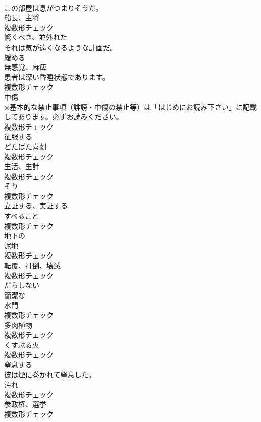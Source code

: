 \documentclass[8pt]{extreport}
\begin{document}
\begin{CJK}{UTF8}{min}
\\	この部屋は息がつまりそうだ。	
\\	[名詞]	船⻑、主将	
\\	複数形チェック
\\	[形容詞]	驚くべき、並外れた	
\\	それは気が遠くなるような計画だ。	
\\	[動詞]	緩める	
\\	[名詞]	無感覚、麻痺	
\\	患者は深い昏睡状態であります。	
\\	複数形チェック
\\	[名詞]	中傷	
\\	※基本的な禁止事項（誹謗・中傷の禁止等）は「はじめにお読み下さい」に記載してあります。必ずお読みください。	
\\	複数形チェック
\\	[動詞]	征服する	
\\	[名詞]	どたばた喜劇	
\\	複数形チェック
\\	[名詞]	生活、生計	
\\	複数形チェック
\\	[名詞]	そり	
\\	複数形チェック
\\	[動詞]	立証する、実証する	
\\	[名詞]	すべること	
\\	複数形チェック
\\	[形容詞]	地下の	
\\	[名詞]	泥地	
\\	複数形チェック
\\	[名詞]	転覆、打倒、壊滅	
\\	複数形チェック
\\	[形容詞]	だらしない	
\\	[形容詞]	簡潔な	
\\	[名詞]	水門	
\\	複数形チェック
\\	[名詞]	多肉植物	
\\	複数形チェック
\\	[名詞]	くすぶる火	
\\	複数形チェック
\\	[動詞]	窒息する	
\\	彼は煙に巻かれて窒息した。	
\\	[名詞]	汚れ	
\\	複数形チェック
\\	[名詞]	参政権、選挙	
\\	複数形チェック

\end{CJK}
\end{document}
